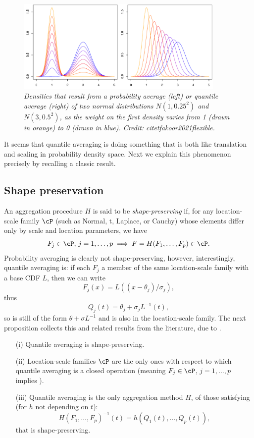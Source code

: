 \documentclass{article}
\begin{document}
\begin{figure}[htb]
\centering
\includegraphics[width=0.9\textwidth]{prob_quant.pdf} 
\caption{\it Densities that result from a probability average (left) or quantile
  average (right) of two normal distributions $N(1,0.25^2)$ and $N(3, 0.5^2)$,
  as the weight on the first density varies from 1 (drawn in orange) to 0
  (drawn in blue). Credit: citet{fakoor2021flexible}.}  
\label{fig:prob_quant}
\end{figure}

It seems that quantile averaging is doing something that is both like
translation and scaling in probability density space. Next we explain this
phenomenon precisely by recalling a classic result.   

\subsection{Shape preservation}

An aggregation procedure $H$ is said to be \emph{shape-preserving} if, for any
location-scale family $\cP$ (such as Normal, t, Laplace, or Cauchy) whose
elements differ only by scale and location parameters, we have     
\[ 
F_j \in \cP, \, j=1,\dots,p \implies F = H(F_1,\dots,F_p) \in \cP.  
\]
Probability averaging is clearly not shape-preserving, however, interestingly,
quantile averaging is: if each $F_j$ a member of the same location-scale family
with a base CDF $L$, then we can write 
\[
F_j(x) = L((x-\theta_j)/\sigma_j),
\]
thus
\[
Q_j(t) = \theta_j + \sigma_j L^{-1}(t),
\]
so  is still of the form $\theta + \sigma L^{-1}$ and
 is also in the location-scale family. The next proposition
collects this and related results from the literature, due to
\citet{thomas1980appropriate, genest1992vincentization}.  

\begin{proposition}
\label{prop:shape_preservation} \hfill 
\begin{itemize}
\item[(i)] Quantile averaging is shape-preserving.        
\item[(ii)] Location-scale families $\cP$ are the only ones with respect to
  which quantile averaging is a closed operation (meaning $F_j \in \cP$,
  $j=1,\dots,p$ implies ).     
\item[(iii)] Quantile averaging is the only aggregation method $H$, of those 
  satisfying (for $h$ not depending on $t$):  
  \[
    H(F_1,\dots,F_p)^{-1}(t) = h(Q_1(t),\dots,Q_p(t)),
  \]
  that is shape-preserving.
\end{itemize}
\end{proposition}
\end{document}
